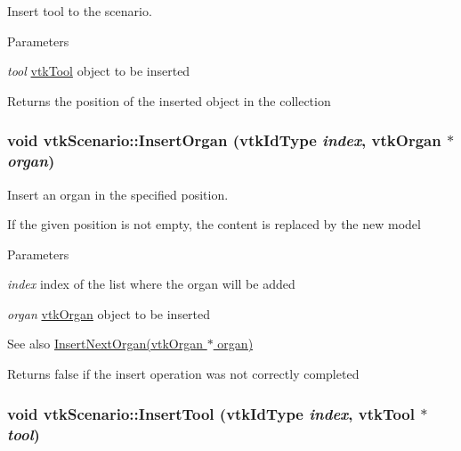 Insert tool to the scenario. 


\begin{DoxyParams}{Parameters}
\item[{\em tool}]\hyperlink{classvtkTool}{vtkTool} object to be inserted \end{DoxyParams}
\begin{DoxyReturn}{Returns}
the position of the inserted object in the collection 
\end{DoxyReturn}
\hypertarget{classvtkScenario_a449c388c17ebaa975c69269e2b032530}{
\subsubsection[{InsertOrgan}]{\setlength{\rightskip}{0pt plus 5cm}void vtkScenario::InsertOrgan (vtkIdType {\em index}, \/  {\bf vtkOrgan} $\ast$ {\em organ})}}
\label{classvtkScenario_a449c388c17ebaa975c69269e2b032530}


Insert an organ in the specified position. 

If the given position is not empty, the content is replaced by the new model 
\begin{DoxyParams}{Parameters}
\item[{\em index}]index of the list where the organ will be added \item[{\em organ}]\hyperlink{classvtkOrgan}{vtkOrgan} object to be inserted \end{DoxyParams}
\begin{DoxySeeAlso}{See also}
\hyperlink{classvtkScenario_ab7aa43b4f165675fdfc437e142a466f3}{InsertNextOrgan(vtkOrgan $\ast$ organ)} 
\end{DoxySeeAlso}
\begin{DoxyReturn}{Returns}
false if the insert operation was not correctly completed 
\end{DoxyReturn}
\hypertarget{classvtkScenario_a4c250cc389a2da4caff6db86c12822e3}{
\subsubsection[{InsertTool}]{\setlength{\rightskip}{0pt plus 5cm}void vtkScenario::InsertTool (vtkIdType {\em index}, \/  {\bf vtkTool} $\ast$ {\em tool})}}
\label{classvtkScenario_a4c250cc389a2da4caff6db86c12822e3}


